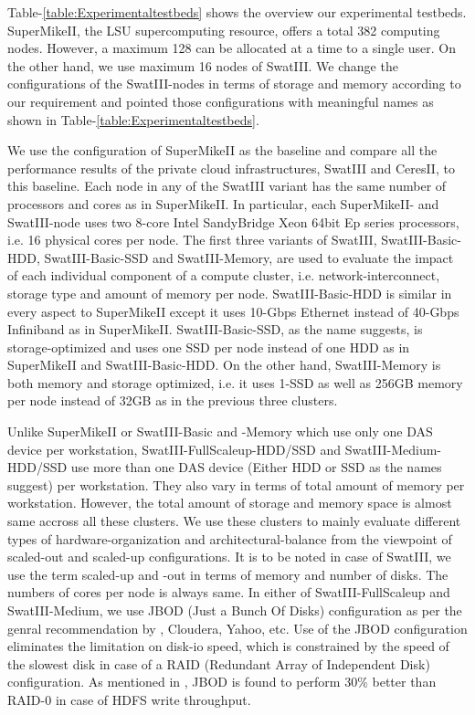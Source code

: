 \documentclass[conference]{IEEEtran}
\begin{document}
Table-\ref{table:Experimentaltestbeds} shows the overview our experimental testbeds.
SuperMikeII, the LSU supercomputing resource, offers a total 382 computing nodes. However, a maximum 128 can be allocated at a time to a single user.
On the other hand, we use maximum 16 nodes of SwatIII. We change the configurations of the SwatIII-nodes in terms of storage and memory according to our requirement and pointed those configurations with meaningful names as shown in Table-\ref{table:Experimentaltestbeds}. 

We use the configuration of SuperMikeII as the baseline and compare all the performance results of the private cloud infrastructures, SwatIII and CeresII, to this baseline.
Each node in any of the SwatIII variant has the same number of processors and cores as in SuperMikeII.
In particular, each SuperMikeII- and SwatIII-node uses two 8-core Intel SandyBridge Xeon 64bit Ep series processors, i.e. 16 physical cores per node.
The first three variants of SwatIII, SwatIII-Basic-HDD, SwatIII-Basic-SSD and SwatIII-Memory, are used to evaluate the impact of each individual component of a compute cluster, i.e. network-interconnect, storage type and amount of memory per node.
SwatIII-Basic-HDD is similar in every aspect to SuperMikeII except it uses 10-Gbps Ethernet instead of 40-Gbps Infiniband as in SuperMikeII.
SwatIII-Basic-SSD, as the name suggests, is storage-optimized and uses one SSD per node instead of one HDD as in SuperMikeII and SwatIII-Basic-HDD.
On the other hand, SwatIII-Memory is both memory and storage optimized, i.e. it uses 1-SSD as well as 256GB memory per node instead of 32GB as in the previous three clusters.

Unlike SuperMikeII or SwatIII-Basic and -Memory which use only one DAS device per workstation, SwatIII-FullScaleup-HDD/SSD and SwatIII-Medium-HDD/SSD use more than one DAS device (Either HDD or SSD as the names suggest) per workstation.
They also vary in terms of total amount of memory per workstation.
However, the total amount of storage and memory space is almost same accross all these clusters.
We use these clusters to mainly evaluate different types of hardware-organization and architectural-balance from the viewpoint of scaled-out and scaled-up configurations.
It is to be noted in case of SwatIII, we use the term scaled-up and -out in terms of memory and number of disks. The numbers of cores per node is always same.
In either of SwatIII-FullScaleup and SwatIII-Medium, we use JBOD (Just a Bunch Of Disks) configuration as per the genral recommendation by \cite{fw:hadoop}, Cloudera, Yahoo, etc.
Use of the JBOD configuration eliminates the limitation on disk-io speed, which is constrained by the speed of the slowest disk in case of a RAID (Redundant Array of Independent Disk) configuration.
As mentioned in \cite{fw:hadoop}, JBOD is found to perform 30\% better than RAID-0 in case of HDFS write throughput.
\end{document}
